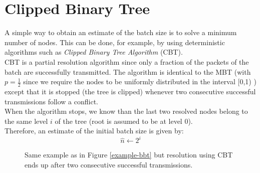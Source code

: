\documentclass[11pt,a4paper,twoside,openright]{book}
\begin{document}
\section{Clipped Binary Tree}
\label{cbt-estimation}
A simple way to obtain an estimate of the batch size is to solve a minimum number of nodes. This can be done, for example, by using deterministic algorithms such as \emph{Clipped Binary Tree Algorithm} (CBT).\\
CBT is a partial resolution algorithm since only a fraction of the packets of the batch are successfully transmitted.
The algorithm is identical to the MBT (with $\displaystyle p=\frac{1}{2}$ since we require the nodes to be uniformly distributed in the interval [0,1) ) except that it is stopped (the tree is clipped) whenever two consecutive successful transmissions follow a conflict.\\
When the algorithm stops, we know than the last two resolved nodes belong to the same level $i$ of the tree (root is assumed to be at level 0).\\
Therefore, an estimate of the initial batch size is given by:
\begin{equation}
\hat{n}\gets2^{i}
\end{equation}

\begin{figure}[H]
\centering
{}
\caption[\emph{CBT}: Example]{ Same example as in Figure \ref{example-bbt} but resolution using CBT ends up after two consecutive successful transmissions.}
\end{figure}
\end{document}

